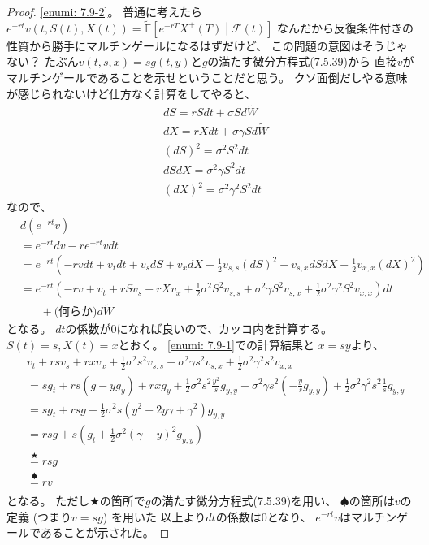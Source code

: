 \documentclass[uplatex]{jsarticle}
\theoremstyle{definition}
\def\E{\mathbb{E}}
\def\mcF{\mathcal{F}}
\begin{document}
\begin{proof}
  \ref{enumi: 7.9-2}。
  普通に考えたら
  \(e^{-rt}v\left(t,S(t),X(t)\right)
  = \tilde{\E}\left[e^{-rT}X^+(T)\middle|\mcF(t)\right]\)
  なんだから反復条件付きの性質から勝手にマルチンゲールになるはずだけど、
  この問題の意図はそうじゃない？
  たぶん\(v(t,s,x) = sg(t,y)\)と\(g\)の満たす微分方程式(7.5.39)から
  直接\(v\)がマルチンゲールであることを示せということだと思う。
  クソ面倒だしやる意味が感じられないけど仕方なく計算をしてやると、
  \begin{align*}
    &dS = rSdt + \sigma S d\tilde{W} \\
    &dX = rXdt + \sigma \gamma S d\tilde{W} \\
    &(dS)^2 = \sigma^2 S^2 dt \\
    &dSdX = \sigma^2 \gamma S^2 dt \\
    &(dX)^2 = \sigma^2 \gamma^2 S^2 dt
  \end{align*}
  なので、
  \begin{align*}
    &d\left( e^{-rt}v\right) \\
    &= e^{-rt}dv - re^{-rt}vdt \\
    &= e^{-rt}\left( - rvdt
    + v_t dt + v_s dS + v_x dX
    + \frac{1}{2}v_{s,s}(dS)^2
    + v_{s,x}dSdX
    + \frac{1}{2}v_{x,x}(dX)^2
    \right) \\
    &= e^{-rt}\left( - rv
    + v_t + rS v_s + rX v_x
    + \frac{1}{2}\sigma^2 S^2 v_{s,s}
    + \sigma^2 \gamma S^2 v_{s,x}
    + \frac{1}{2} \sigma^2 \gamma^2 S^2 v_{x,x}\right) dt \\
    &\ \ \ \ \ \ \ \
    + \text{(何らか)}d\tilde{W}
  \end{align*}
  となる。
  \(dt\)の係数が\(0\)になれば良いので、カッコ内を計算する。
  \(S(t)=s, X(t)=x\)とおく。
  \ref{enumi: 7.9-1}での計算結果と
  \(x = sy\)より、
  \begin{align*}
    & v_t + rs v_s + rx v_x
    + \frac{1}{2}\sigma^2 s^2 v_{s,s}
    + \sigma^2 \gamma s^2 v_{s,x}
    + \frac{1}{2} \sigma^2 \gamma^2 s^2 v_{x,x} \\
    &= sg_t + rs(g-yg_y) + rxg_y
    + \frac{1}{2}\sigma^2 s^2 \frac{y^2}{s}g_{y,y}
    + \sigma^2 \gamma s^2 \left( - \frac{y}{s}g_{y,y}\right)
    + \frac{1}{2} \sigma^2 \gamma^2 s^2 \frac{1}{s}g_{y,y} \\
    &= sg_t + rsg
    + \frac{1}{2}\sigma^2 s
    \left( y^2 - 2y\gamma + \gamma^2 \right)g_{y,y} \\
    &= rsg + s\left( g_t
    + \frac{1}{2}\sigma^2 (\gamma - y)^2g_{y,y}\right) \\
    &\overset{\bigstar}{=} rsg \\
    &\overset{\spadesuit}{=} rv \\
  \end{align*}
  となる。
  ただし\(\bigstar\)の箇所で\(g\)の満たす微分方程式(7.5.39)を用い、
  \(\spadesuit\)の箇所は\(v\)の定義 (つまり\(v=sg\)) を用いた
  以上より\(dt\)の係数は\(0\)となり、
  \(e^{-rt}v\)はマルチンゲールであることが示された。


\end{proof}
\end{document}
